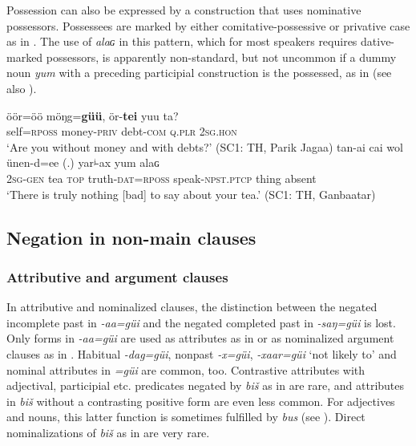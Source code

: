 \documentclass[output=paper,colorlinks,citecolor=brown,chinesefont]{langscibook}
\begin{document}
Possession can also be expressed by a construction that uses nominative possessors. Possessees are marked by either comitative-possessive or privative case as in . The use of \textit{alaɢ} in this pattern, which for most speakers requires dative-marked possessors, is apparently non-standard, but not uncommon if a dummy noun \textit{yum} with a preceding participial construction is the possessed, as in  (see also \citealt[101]{Brosig2015Negation}).


\ea\label{ex:kha:34}
    \gll öör=öö möŋg=\textbf{güü}, ör-\textbf{tei} yuu ta? \\ 
         self\textsc{=rposs} money-\textsc{priv} debt-\textsc{com} \textsc{q.plr} \textsc{2sg.hon} \\
    \glt ‘Are you without money and with debts?’ (SC1: TH, Parik Jagaa)
\z 
\ea\label{ex:kha:35} 
    \gll tan-ai cai wol ünen-d=ee (.) yarʲ-ax yum alaɢ \\ 
         \textsc{2sg-gen} tea \textsc{top} truth-\textsc{dat=rposs} {} speak-\textsc{npst.ptcp} thing absent \\
    \glt ‘There is truly nothing [bad] to say about your tea.’ (SC1: TH, Ganbaatar)
\z 

 
\subsection{Negation in non-main clauses}\label{sec:kha:2.4}
\subsubsection{Attributive and argument clauses}\label{sec:kha:2.4.1}

In attributive and nominalized clauses, the distinction between the negated incomplete past in \textit{-aa=güi} and the negated completed past in \textit{-saŋ=güi} is lost. Only forms in \textit{-aa=güi} are used as attributes as in  or as nominalized argument clauses as in . Habitual \textit{-dag=güi}, nonpast \textit{-x=güi}, \textit{-xaar=güi} ‘not likely to’ and nominal attributes in \textit{=güi} are common, too. 
Contrastive attributes with adjectival, participial etc. predicates negated by \textit{biš} as in  are rare, and attributes in \textit{biš} without a contrasting positive form are even less common. For adjectives and nouns, this latter function is sometimes fulfilled by \textit{bus} (see ). Direct nominalizations of \textit{biš} as in  are very rare.
\end{document}

